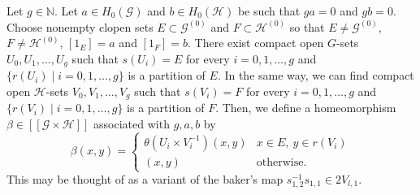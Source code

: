 \documentclass[11pt]{article}
\theoremstyle{definition}
\numberwithin{equation}{section}
\newcommand{\G}{\mathcal{G}}
\renewcommand{\H}{\mathcal{H}}
\newcommand{\N}{\mathbb{N}}
\begin{document}
Let $g\in\N$. 
Let $a\in H_0(\G)$ and $b\in H_0(\H)$ be such that $ga=0$ and $gb=0$. 
Choose nonempty clopen sets $E\subset\G^{(0)}$ and $F\subset\H^{(0)}$ so that 
$E\neq\G^{(0)}$, $F\neq\H^{(0)}$, $[1_E]=a$ and $[1_F]=b$. 
There exist compact open $G$-sets $U_0,U_1,\dots,U_g$ such that 
$s(U_i)=E$ for every $i=0,1,\dots,g$ and 
$\{r(U_i)\mid i=0,1,\dots,g\}$ is a partition of $E$. 
In the same way, we can find compact open $\H$-sets $V_0,V_1,\dots,V_g$ 
such that $s(V_i)=F$ for every $i=0,1,\dots,g$ and 
$\{r(V_i)\mid i=0,1,\dots,g\}$ is a partition of $F$. 
Then, we define a homeomorphism $\beta\in[[\G\times\H]]$ 
associated with $g,a,b$ by 
\[
\beta(x,y)=\begin{cases}
\theta(U_i\times V_i^{-1})(x,y)&x\in E,\ y\in r(V_i)\\
(x,y)&\text{otherwise. }\end{cases}
\]
This may be thought of 
as a variant of the baker's map $s_{1,2}^{-1}s_{1,1}\in2V_{l,1}$. 
\end{document}
